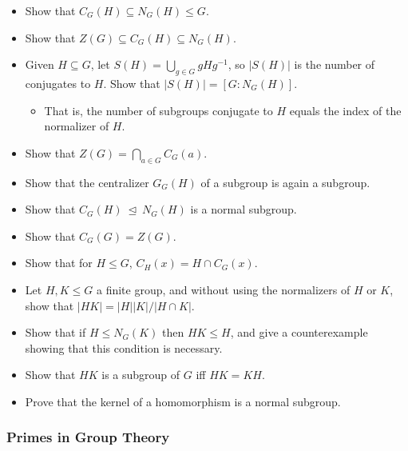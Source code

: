\begin{itemize}
\item
  Show that \(C_G(H) \subseteq N_G(H) \leq G\).
\item
  Show that \(Z(G) \subseteq C_G(H) \subseteq N_G(H)\).
\item
  Given \(H\subseteq G\), let \(S(H)= \bigcup_{g\in G} gHg^{-1}\), so
  \({\left\lvert {S(H)} \right\rvert}\) is the number of conjugates to
  \(H\). Show that \({\left\lvert {S(H)} \right\rvert} = [G : N_G(H)]\).

  \begin{itemize}
  \tightlist
  \item
    That is, the number of subgroups conjugate to \(H\) equals the index
    of the normalizer of \(H\).
  \end{itemize}
\item
  Show that \(Z(G) = \bigcap_{a\in G} C_G(a)\).
\item
  Show that the centralizer \(G_G(H)\) of a subgroup is again a
  subgroup.
\item
  Show that \(C_G(H) {~\trianglelefteq~}N_G(H)\) is a normal subgroup.
\item
  Show that \(C_G(G) = Z(G)\).
\item
  Show that for \(H\leq G\), \(C_H(x) = H \cap C_G(x)\).
\item
  Let \(H, K \leq G\) a finite group, and without using the normalizers
  of \(H\) or \(K\), show that
  \({\left\lvert {HK} \right\rvert} = {\left\lvert {H} \right\rvert} {\left\lvert {K} \right\rvert}/{\left\lvert {H\cap K} \right\rvert}\).
\item
  Show that if \(H \leq N_G(K)\) then \(HK \leq H\), and give a
  counterexample showing that this condition is necessary.
\item
  Show that \(HK\) is a subgroup of \(G\) iff \(HK = KH\).
\item
  Prove that the kernel of a homomorphism is a normal subgroup.
\end{itemize}

\hypertarget{primes-in-group-theory}{%
\subsubsection{Primes in Group Theory}\label{primes-in-group-theory}}


